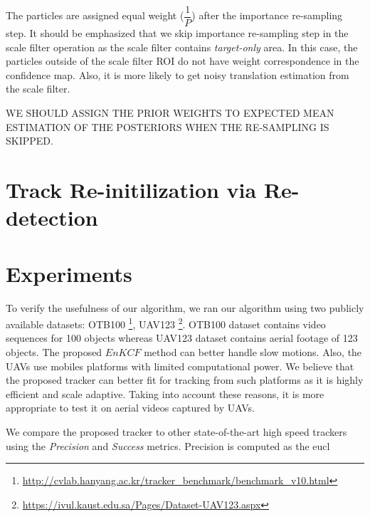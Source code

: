 \documentclass[10pt,twocolumn,letterpaper]{article}
\newcounter{ct}
\begin{document}
The particles are assigned equal weight ($\dfrac{1}{P}$) after the
importance re-sampling step. It should be emphasized that we skip
importance re-sampling step in the scale filter operation as the scale
filter contains \textit{target-only} area. In this case, the particles
outside of the scale filter ROI do not have weight correspondence in
the confidence map. Also, it is more likely to get noisy translation
estimation from the scale filter.

WE SHOULD ASSIGN THE PRIOR WEIGHTS TO EXPECTED MEAN ESTIMATION OF THE
POSTERIORS WHEN THE RE-SAMPLING IS SKIPPED.
\section{Track Re-initilization via Re-detection}
\label{sc:Re-initialization}


\section{Experiments} \label{sc:Experiments}
To verify the usefulness of our algorithm, we ran our algorithm using
two publicly available datasets:
OTB100 \footnote{\url{http://cvlab.hanyang.ac.kr/tracker_benchmark/benchmark_v10.html}},
UAV123 \footnote{\url{https://ivul.kaust.edu.sa/Pages/Dataset-UAV123.aspx}}\cite{mueller2016uav123}. OTB100 dataset contains video sequences for 100 objects whereas UAV123 dataset contains aerial footage of 123 objects. The proposed $EnKCF$ method can better handle slow motions. Also, the UAVs use mobiles platforms with limited computational power. We believe that the proposed tracker can better fit for tracking from such platforms as it is highly efficient and scale adaptive. Taking into account these reasons, it is more appropriate to test it on aerial videos captured by UAVs. 

We compare the proposed tracker to other state-of-the-art high speed trackers using the \textit{Precision} and \textit{Success} metrics. Precision is computed as the eucl%
\end{document}
